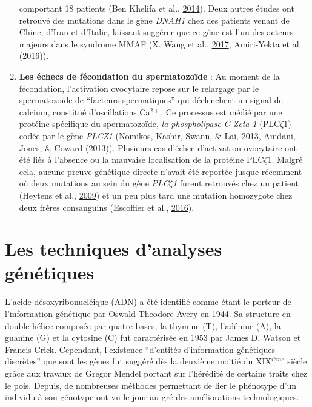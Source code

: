 \documentclass[12pt,twoside]{reedthesis}
\theoremstyle{definition}
\theoremstyle{definition}
\theoremstyle{remark}
\begin{document}
\begin{enumerate}
    comportant 18 patients (Ben Khelifa et al.,
    \protect\hyperlink{ref-BenKhelifa2014}{2014}). Deux autres études ont
    retrouvé des mutations dans le gène \emph{DNAH1} chez des patients
    venant de Chine, d'Iran et d'Italie, laissant suggérer que ce gène est
    l'un des acteurs majeurs dans le syndrome MMAF (X. Wang et al.,
    \protect\hyperlink{ref-Wang2017}{2017}, Amiri-Yekta et al.
    (\protect\hyperlink{ref-Amiri-Yekta2016}{2016})).
  \item
    \textbf{Les échecs de fécondation du spermatozoïde} : Au moment de la
    fécondation, l'activation ovocytaire repose sur le relargage par le
    spermatozoïde de ``facteurs spermatiques'' qui déclenchent un signal
    de calcium, constitué d'oscillations Ca\(^{2+}\). Ce processus est
    médié par une protéine spécifique du spermatozoïde, \emph{la
    phospholipase C Zeta 1} (PLC\(\zeta 1\)) codée par le gène
    \emph{PLCZ1} (Nomikos, Kashir, Swann, \& Lai,
    \protect\hyperlink{ref-Nomikos2013}{2013}, Amdani, Jones, \& Coward
    (\protect\hyperlink{ref-Amdani2013}{2013})). Plusieurs cas d'échec
    d'activation ovocytaire ont été liés à l'absence ou la mauvaise
    localisation de la protéine PLC\(\zeta1\). Malgré cela, aucune preuve
    génétique directe n'avait été reportée jusque récemment où deux
    mutations au sein du gène \emph{PLC}\(\zeta\)\emph{1} furent retrouvés
    chez un patient (Heytens et al.,
    \protect\hyperlink{ref-Heytens2009}{2009}) et un peu plus tard une
    mutation homozygote chez deux frères consanguins (Escoffier et al.,
    \protect\hyperlink{ref-Escoffier2016}{2016}).
  \end{enumerate}
  
  \newpage  
  
  \section{Les techniques d'analyses
  génétiques}\label{les-techniques-danalyses-genetiques}
  
  L'acide désoxyribonucléique (ADN) a été identifié comme étant le porteur
  de l'information génétique par Oswald Theodore Avery en 1944. Sa
  structure en double hélice composée par quatre bases, la thymine (T),
  l'adénine (A), la guanine (G) et la cytosine (C) fut caractérisée en
  1953 par James D. Watson et Francis Crick. Cependant, l'existence
  ``d'entités d'information génétiques discrètes'' que sont les gènes fut
  suggéré dès la deuxième moitié du XIX\(^{ième}\) siècle grâce aux
  travaux de Gregor Mendel portant sur l'hérédité de certains traits chez
  le pois. Depuis, de nombreuses méthodes permettant de lier le phénotype
  d'un individu à son génotype ont vu le jour au gré des améliorations
  technologiques.
  
\end{document}

